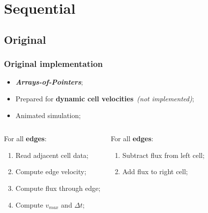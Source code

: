 \section{Sequential}


\subsection{Original}
\begin{frame}
	\frametitle{Original implementation}
	\begin{itemize}
		\item \textbf{\itshape Arrays-of-Pointers};
		\item Prepared for \textbf{dynamic cell velocities}\ \textit{(not implemented)};
		\item Animated simulation;
	\end{itemize}

	\begin{columns}
		\pause
		\begin{block}{\computeflux}
			\smaller
			For all \textbf{edges}:
			\begin{enumerate}
				\item Read adjacent cell data;	
				\item Compute edge velocity;
				\item Compute flux through edge;
				\item Compute $v_{max}$ and $\Delta t$;
			\end{enumerate}
		\end{block}

		\pause
		\begin{block}{\update}
			\smaller
			For all \textbf{edges}:
			\begin{enumerate}
				\item Subtract flux from left cell;
				\item Add flux to right cell;
			\end{enumerate}
		\end{block}
	\end{columns}
\end{frame}

